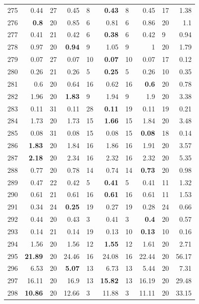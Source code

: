 \begin{longtable}{lr@{\hskip 4pt}l@{\hskip 12pt}r@{\hskip 4pt}l@{\hskip 12pt}r@{\hskip 4pt}l@{\hskip 12pt}r@{\hskip 4pt}l@{\hskip 12pt}r}
275 & 0.44 & 27 & 0.45 & 8 & \textbf{0.43} & 8 & 0.45 & 17 & 1.38 \\
276 & \textbf{0.8} & 20 & 0.85 & 6 & 0.81 & 6 & 0.86 & 20 & 1.1 \\
277 & 0.41 & 21 & 0.42 & 6 & \textbf{0.38} & 6 & 0.42 & 9 & 0.94 \\
278 & 0.97 & 20 & \textbf{0.94} & 9 & 1.05 & 9 & 1 & 20 & 1.79 \\
279 & 0.07 & 27 & 0.07 & 10 & \textbf{0.07} & 10 & 0.07 & 17 & 0.12 \\
280 & 0.26 & 21 & 0.26 & 5 & \textbf{0.25} & 5 & 0.26 & 10 & 0.35 \\
281 & 0.6 & 20 & 0.64 & 16 & 0.62 & 16 & \textbf{0.6} & 20 & 0.78 \\
282 & 1.96 & 20 & \textbf{1.83} & 9 & 1.94 & 9 & 1.9 & 20 & 3.38 \\
283 & 0.11 & 31 & 0.11 & 28 & \textbf{0.11} & 19 & 0.11 & 19 & 0.21 \\
284 & 1.73 & 20 & 1.73 & 15 & \textbf{1.66} & 15 & 1.84 & 20 & 3.48 \\
285 & 0.08 & 31 & 0.08 & 15 & 0.08 & 15 & \textbf{0.08} & 18 & 0.14 \\
286 & \textbf{1.83} & 20 & 1.84 & 16 & 1.86 & 16 & 1.91 & 20 & 3.57 \\
287 & \textbf{2.18} & 20 & 2.34 & 16 & 2.32 & 16 & 2.32 & 20 & 5.35 \\
288 & 0.77 & 20 & 0.78 & 14 & 0.74 & 14 & \textbf{0.73} & 20 & 0.98 \\
289 & 0.47 & 22 & 0.42 & 5 & \textbf{0.41} & 5 & 0.41 & 11 & 1.32 \\
290 & 0.61 & 21 & 0.61 & 16 & \textbf{0.61} & 16 & 0.61 & 11 & 1.53 \\
291 & 0.34 & 24 & \textbf{0.25} & 19 & 0.27 & 19 & 0.28 & 24 & 0.66 \\
292 & 0.44 & 20 & 0.43 & 3 & 0.41 & 3 & \textbf{0.4} & 20 & 0.57 \\
293 & 0.14 & 21 & 0.14 & 19 & 0.13 & 10 & \textbf{0.13} & 10 & 0.16 \\
294 & 1.56 & 20 & 1.56 & 12 & \textbf{1.55} & 12 & 1.61 & 20 & 2.71 \\
295 & \textbf{21.89} & 20 & 24.46 & 16 & 24.08 & 16 & 22.44 & 20 & 56.17 \\
296 & 6.53 & 20 & \textbf{5.07} & 13 & 6.73 & 13 & 5.44 & 20 & 7.31 \\
297 & 16.11 & 20 & 16.9 & 13 & \textbf{15.82} & 13 & 16.19 & 20 & 29.48 \\
298 & \textbf{10.86} & 20 & 12.66 & 3 & 11.88 & 3 & 11.11 & 20 & 33.15 \\

\end{longtable}

